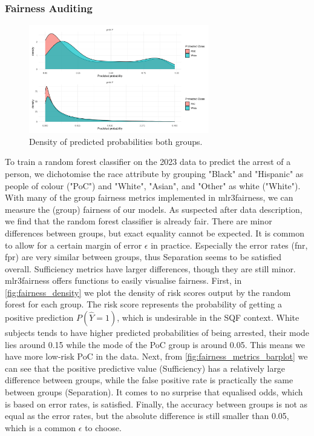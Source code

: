 \subsubsection*{Fairness Auditing}
\begin{figure}
    \centering
    \includegraphics[width=0.7\textwidth]{../figures/sqf_case_study_plot7.png}
    \caption{Density of predicted probabilities both groups.}
    \label{fig:fairness_density}
\end{figure}
To train a random forest classifier on the 2023 data to predict the arrest of a person, we dichotomise the race attribute by grouping "Black" and "Hispanic" as people of colour ("PoC") and "White", "Asian", and "Other" as white ("White").
With many of the group fairness metrics implemented in mlr3fairness, we can measure the (group) fairness of our models.
As suspected after data description, we find that the random forest classifier is already fair. There are minor differences between groups, but exact equality cannot be expected. It is common to allow for a certain margin of error $\epsilon$ in practice.
Especially the error rates (fnr, fpr) are very similar between groups, thus Separation seems to be satisfied overall. Sufficiency metrics have larger differences, though they are still minor. mlr3fairness offers functions to easily visualise fairness. First, in \autoref{fig:fairness_density} we plot the density of risk scores output by the random forest for each group.
The risk score represents the probability of getting a positive prediction $P(\hat{Y} = 1)$, which is undesirable in the SQF context. White subjects tends to have higher predicted probabilities of being arrested, their mode lies around 0.15 while the mode of the PoC group is around 0.05. This means we have more low-risk PoC in the data. Next, from \autoref{fig:fairness_metrics_barplot} we can see that the positive predictive value (Sufficiency) has a relatively large difference between groups,
while the false positive rate is practically the same between groups (Separation). It comes to no surprise that equalised odds, which is based on error rates, is satisfied. Finally, the accuracy between groups is not as equal as the error rates, but the absolute difference is still smaller than 0.05, which is a common $\epsilon$ to choose.
